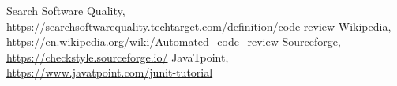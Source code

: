 \documentclass[10pt,letterpaper]{article}
\begin{document}
\begin{thebibliography}{9}
Search Software Quality,\\
\url{https://searchsoftwarequality.techtarget.com/definition/code-review}
Wikipedia,\\
\url{https://en.wikipedia.org/wiki/Automated_code_review}
Sourceforge,\\
\url{https://checkstyle.sourceforge.io/}
JavaTpoint,\\
\url{https://www.javatpoint.com/junit-tutorial}
\end{thebibliography}
\end{document}

